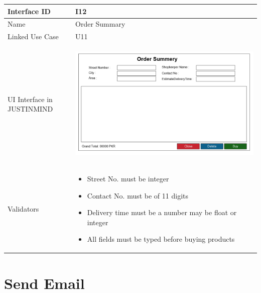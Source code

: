 \documentclass[12pt,a4paper]{report}
\begin{document}
\begin{tabular}{ | m{3cm} | m{12cm}| } \hline

Interface ID & I12  \\\hline

Name  & Order Summary  \\ \hline

Linked Use Case & U11 \\ \hline

UI Interface in JUSTINMIND & \begin{center} \includegraphics[scale=0.3]{./UIs for Latex Reports/UI-012 Order Summery@1x.png}\end{center}  \\ \hline

Validators & 
\begin{itemize}
\item   Street No. must be integer
\item   Contact No. must be of 11 digits
\item   Delivery time must be a number may be float or integer
\item   All fields must be typed before buying products


\end{itemize}
\\ \hline

\end{tabular} 
\section{Send Email }
\end{document}
